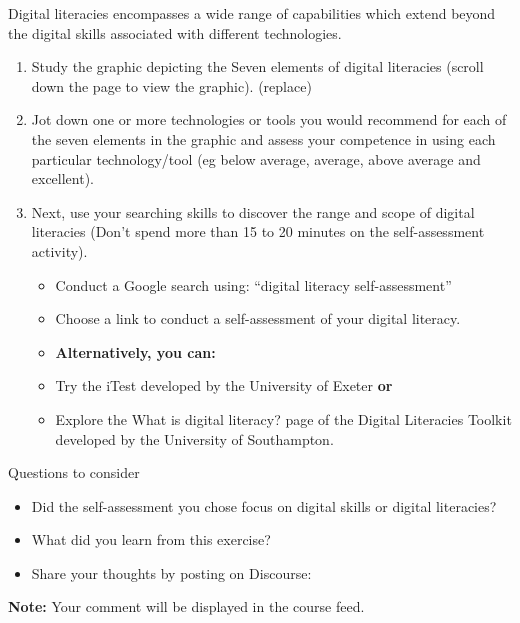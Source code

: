 \documentclass[
]{book}
\providecommand{\tightlist}{%
  \setlength{\itemsep}{0pt}\setlength{\parskip}{0pt}}
\theoremstyle{definition}
\theoremstyle{definition}
\theoremstyle{definition}
\theoremstyle{definition}
\theoremstyle{remark}
\begin{document}
\begin{reflect}
Digital literacies encompasses a wide range of capabilities which extend beyond the digital skills associated with different technologies.

\begin{enumerate}
\def\labelenumi{\arabic{enumi}.}
\tightlist
\item
  Study the graphic depicting the Seven elements of digital literacies (scroll down the page to view the graphic). (replace)\\
\item
  Jot down one or more technologies or tools you would recommend for each of the seven elements in the graphic and assess your competence in using each particular technology/tool (eg below average, average, above average and excellent).\\
\item
  Next, use your searching skills to discover the range and scope of digital literacies (Don't spend more than 15 to 20 minutes on the self-assessment activity).

  \begin{itemize}
  \tightlist
  \item
    Conduct a Google search using: ``digital literacy self-assessment''\\
  \item
    Choose a link to conduct a self-assessment of your digital literacy.\\
  \item
    \textbf{Alternatively, you can:}\\
  \item
    Try the iTest developed by the University of Exeter \textbf{or}\\
  \item
    Explore the What is digital literacy? page of the Digital Literacies Toolkit developed by the University of Southampton.
  \end{itemize}
\end{enumerate}

{Questions to consider}

\begin{itemize}
\tightlist
\item
  Did the self-assessment you chose focus on digital skills or digital literacies?
\item
  What did you learn from this exercise?
\item
  Share your thoughts by posting on Discourse:
\end{itemize}

\textbf{Note:} Your comment will be displayed in the course feed.
\end{reflect}
\end{document}
